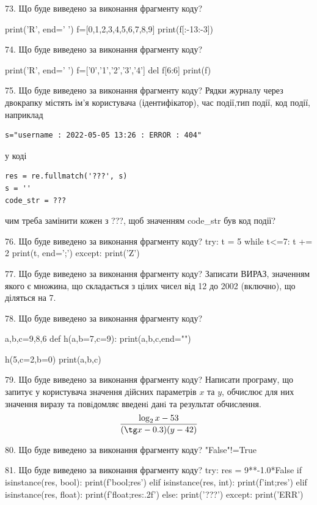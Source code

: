 \documentclass[11pt]{article}
\begin{document}

73. Що буде виведено за виконання фрагменту коду?

print('R', end=' ')
f=[0,1,2,3,4,5,6,7,8,9]
print(f[:-13:-3])



74. Що буде виведено за виконання фрагменту коду?

print('R', end=' ')
f=['0','1','2','3','4']
del f[6:6]
print(f)



75. Що буде виведено за виконання фрагменту коду?
Рядки журналу через двокрапку містять ім'я користувача (ідентифікатор), час події,тип події, код події, наприклад
\begin{verbatim}
s="username : 2022-05-05 13:26 : ERROR : 404"
\end{verbatim}
у коді 
\begin{verbatim}
res = re.fullmatch('???', s) 
s = ''
code_str = ??? 
\end{verbatim}
чим треба замінити кожен з ???, щоб значенням code\_str був код події? 




76. Що буде виведено за виконання фрагменту коду?
try:
    t = 5
    while t<=7:
        t += 2
    print(t, end=';')
except:
    print('Z')


77. Що буде виведено за виконання фрагменту коду?
Записати ВИРАЗ, значенням якого є множина, що складається з цілих чисел від 12 до 2002 (включно), що діляться на 7.

78. Що буде виведено за виконання фрагменту коду?

a,b,c=9,8,6
def h(a,b=7,c=9):
    print(a,b,c,end="")

h(5,c=2,b=0)
print(a,b,c)



79. Що буде виведено за виконання фрагменту коду?
Написати програму, що запитує у користувача значення дійсних параметрів $x$ та $y$, обчислює для них значення виразу та повiдомляє введенi данi та результат обчислення.
$$\frac{\log_{2} x - 53}{(\tg x - 0.3) (y - 42)}$$ 



80. Що буде виведено за виконання фрагменту коду?
"False"!=True

81. Що буде виведено за виконання фрагменту коду?
try:
    res = 9**-1.0*False
    if isinstance(res, bool):
        print(f'bool;{res}')
    elif isinstance(res, int):
        print(f'int;{res}')
    elif isinstance(res, float):
        print(f'float;{res:.2f}')
    else:
        print('???')
except:
    print('ERR')
\end{document}
